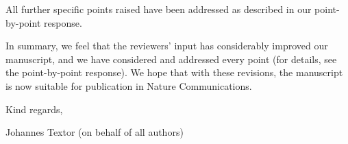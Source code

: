 \documentclass[10pt]{article}
\begin{document}
All further specific points raised have been addressed as described in our point-by-point response.		

In summary, we feel that the reviewers' input has considerably improved our manuscript, and we have considered and addressed every point (for details, see the point-by-point response). We hope that with these revisions, the manuscript is now suitable for publication in Nature Communications. \vspace{10pt}

Kind regards,

Johannes Textor (on behalf of all authors)
\end{document}
